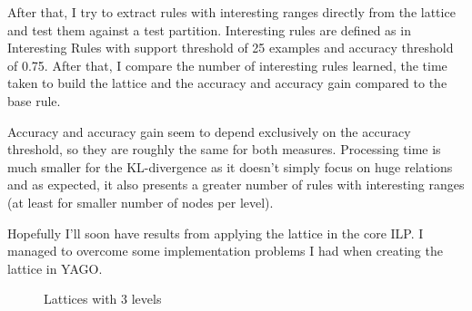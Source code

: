 After that, I try to extract rules with interesting ranges directly from the lattice and test them against a test
partition. Interesting rules are defined as in \refname{Interesting Rules} with support threshold of 25 examples and
accuracy threshold of 0.75. After that, I compare the number of interesting rules learned, the time taken to build the
lattice and the accuracy and accuracy gain compared to the base rule.

Accuracy and accuracy gain seem to depend exclusively on the accuracy threshold, so they are roughly the same for both
measures. Processing time is much smaller for the KL-divergence as it doesn't simply focus on huge relations and as
expected, it also presents a greater number of rules with interesting ranges (at least for smaller number of nodes per
level).

Hopefully I'll soon have results from applying the lattice in the core ILP. I managed to overcome some
implementation problems I had when creating the lattice in YAGO.

\begin{figure}
\caption{Lattices with 3 levels}
\centering
{}

\end{figure}

